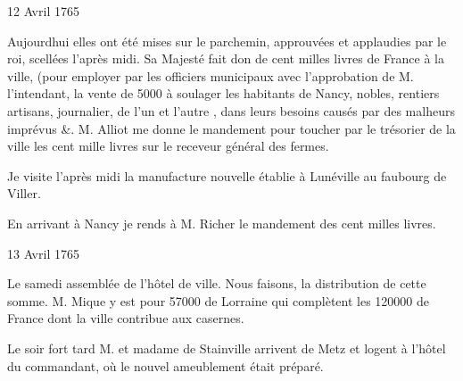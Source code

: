                      \begin{diary}{12 Avril 1765}{}

                         Aujourdhui elles ont été mises sur le
                           parchemin, approuvées et applaudies
                           par le roi, scellées
                           l'après midi. Sa Majesté
                           fait don de cent milles livres de France
                           à la ville, (pour employer par les officiers
                           municipaux avec l'approbation de M.
                              l'intendant, la vente de 5000 à soulager
                           les habitants de Nancy, nobles, rentiers
                           artisans, journalier, de l'un et l'autre
                           , dans leurs besoins causés par des
                           malheurs imprévus \&. M.
                              Alliot me
                           donne le mandement pour toucher par le
                              trésorier de la ville
                           les cent mille
                              livres
                           sur le receveur général des fermes. \bigskip


                         Je visite l'après midi la manufacture
                              nouvelle établie à Lunéville au faubourg
                              de Viller.
                        \bigskip


                         En arrivant à Nancy je rends à M.
                              Richer
                           le mandement des cent milles livres. \bigskip


                     \end{diary}


                     \begin{diary}{13 Avril 1765}{}

                         Le samedi assemblée de l'hôtel de ville. Nous
                           faisons, la distribution de cette somme. M.
                              Mique y est pour 57000\up{\#} de Lorraine
                           qui complètent les 120000 de France
                           dont la ville contribue aux casernes. \bigskip


                         Le soir fort tard M. et madame de Stainville
                           arrivent de Metz et logent à l'hôtel du
                              commandant, où le nouvel ameublement
                           était préparé. \bigskip


                     \end{diary}

